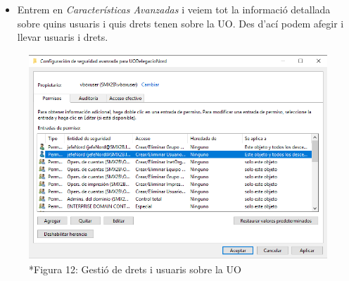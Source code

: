\documentclass[
  a4paper,
]{article}
\providecommand{\tightlist}{%
  \setlength{\itemsep}{0pt}\setlength{\parskip}{0pt}}
\begin{document}
\begin{itemize}
\tightlist
\item
  Entrem en \emph{Características Avanzadas} i veiem tot la informació
  detallada sobre quins usuaris i quis drets tenen sobre la UO. Des
  d'ací podem afegir i llevar usuaris i drets.
\end{itemize}

\begin{figure}
\centering
\includegraphics{png/derechosUOAvanzado.png}
\caption{*Figura 12: Gestió de drets i usuaris sobre la UO}
\end{figure}
\end{document}
